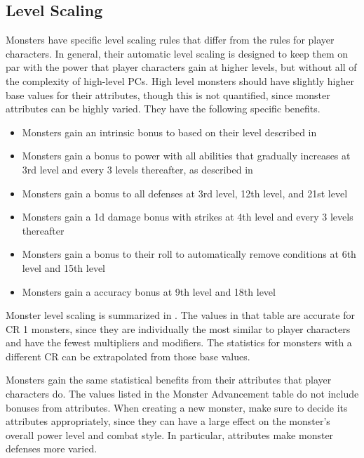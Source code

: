     \subsection{Level Scaling}
        Monsters have specific level scaling rules that differ from the rules for player characters.
        In general, their automatic level scaling is designed to keep them on par with the power that player characters gain at higher levels, but without all of the complexity of high-level PCs.
        High level monsters should have slightly higher base values for their attributes, though this is not quantified, since monster attributes can be highly varied.
        They have the following specific benefits.
        \begin{itemize}
            \item Monsters gain an intrinsic bonus to  based on their level described in 
            \item Monsters gain a  bonus to power with all abilities that gradually increases at 3rd level and every 3 levels thereafter, as described in 
            \item Monsters gain a  bonus to all defenses at 3rd level, 12th level, and 21st level
            \item Monsters gain a \plus1d damage bonus with strikes at 4th level and every 3 levels thereafter
            \item Monsters gain a  bonus to their roll to automatically remove conditions at 6th level and 15th level
            \item Monsters gain a  accuracy bonus at 9th level and 18th level
        \end{itemize}

        Monster level scaling is summarized in .
        The values in that table are accurate for CR 1 monsters, since they are individually the most similar to player characters and have the fewest multipliers and modifiers.
        The statistics for monsters with a different CR can be extrapolated from those base values.

        Monsters gain the same statistical benefits from their attributes that player characters do.
        The values listed in the Monster Advancement table do not include bonuses from attributes.
        When creating a new monster, make sure to decide its attributes appropriately, since they can have a large effect on the monster's overall power level and combat style.
        In particular, attributes make monster defenses more varied.

